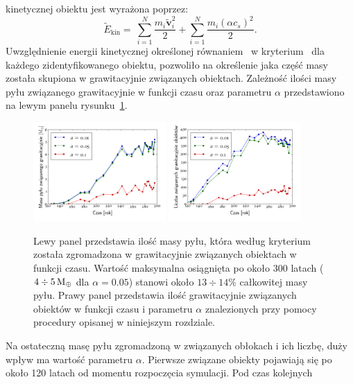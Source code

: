 kinetycznej obiektu jest wyrażona poprzez:
%
\begin{equation}
   \label{eq:ekin}
   \tilde{E}_{\textrm{kin}} = \
   \sum\limits_{i=1}^N \frac{m_i\tilde{\mathbf{v}}_i^2}{2}
   + \sum\limits_{i=1}^N \frac{m_i \left(\alpha c_s\right)^2}{2}.
\end{equation}
%
Uwzględnienie energii kinetycznej określonej równaniem~ w
kryterium~\mref{eq:bcrit} dla każdego zidentyfikowanego obiektu, pozwoliło na
określenie jaka część masy została skupiona w grawitacyjnie związanych
obiektach. Zależność ilości masy pyłu związanego grawitacyjnie w funkcji czasu
oraz parametru $\alpha$ przedstawiono na lewym panelu rysunku~\ref{fig:bmasstime}.
%
\begin{figure}[ht]
  \centering
  \includegraphics[width=0.45\textwidth]{figures/bmass_vs_time}
  \includegraphics[width=0.45\textwidth]{figures/nclumps_vs_time}
  \caption{Lewy panel przedstawia ilość masy pyłu, która według
     kryterium~ została zgromadzona w grawitacyjnie związanych
     obiektach w funkcji czasu. Wartość maksymalna osiągnięta po około 300
     latach ($4\div5\hbox{$\mathrm{\thinspace M_{\oplus}}$}$ dla $\alpha = 0.05$) stanowi około $13\div14\%$
     całkowitej masy pyłu. Prawy panel przedstawia ilość grawitacyjnie
     związanych obiektów w funkcji czasu i parametru $\alpha$ znalezionych przy
     pomocy procedury opisanej w niniejszym rozdziale.}
  \label{fig:bmasstime} 
\end{figure}
%
%
Na ostateczną masę pyłu zgromadzoną w związanych obłokach i ich liczbę, duży
wpływ ma wartość parametru $\alpha$. Pierwsze związane obiekty pojawiają się po
około 120 latach od momentu rozpoczęcia symulacji. Pod czas kolejnych
